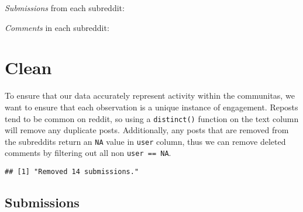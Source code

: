 \documentclass[
]{book}
\newenvironment{Shaded}{\begin{snugshade}}{\end{snugshade}}
\newcommand{\CommentTok}[1]{\textcolor[rgb]{0.56,0.35,0.01}{\textit{#1}}}
\newcommand{\DataTypeTok}[1]{\textcolor[rgb]{0.13,0.29,0.53}{#1}}
\newcommand{\KeywordTok}[1]{\textcolor[rgb]{0.13,0.29,0.53}{\textbf{#1}}}
\newcommand{\NormalTok}[1]{#1}
\newcommand{\OperatorTok}[1]{\textcolor[rgb]{0.81,0.36,0.00}{\textbf{#1}}}
\newcommand{\OtherTok}[1]{\textcolor[rgb]{0.56,0.35,0.01}{#1}}
\newcommand{\StringTok}[1]{\textcolor[rgb]{0.31,0.60,0.02}{#1}}
\begin{document}
\emph{Submissions} from each subreddit:

\emph{Comments} in each subreddit:

\hypertarget{clean}{%
\section{Clean}\label{clean}}

To ensure that our data accurately represent activity within the communitas, we want to ensure that each observation is a unique instance of engagement. Reposts tend to be common on reddit, so using a \texttt{distinct()} function on the text column will remove any duplicate posts. Additionally, any posts that are removed from the subreddits return an \texttt{NA} value in \texttt{user} column, thus we can remove deleted comments by filtering out all non \texttt{user\ ==\ NA}.

\begin{Shaded}
\end{Shaded}

\begin{verbatim}
## [1] "Removed 14 submissions."
\end{verbatim}

\hypertarget{submissions}{%
\subsection{Submissions}\label{submissions}}
\end{document}
